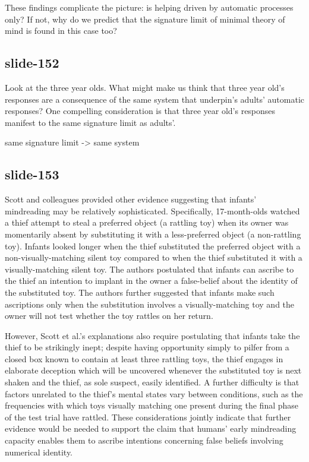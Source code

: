 \documentclass[12pt,\papersize]{extarticle}
\begin{document}
These findings complicate the picture: is helping driven by automatic processes only?
If not, why do we predict that the signature limit of minimal theory of mind
is found in this case too?

\subsection{slide-152}
Look at the three year olds.
What might make us think that three year old’s responses are a consequence
of the same system that underpin’s adults’ automatic responses?
One compelling consideration is that three year old’s responses
manifest to the same signature limit as adults’.

same signature limit -> same system

\subsection{slide-153}
Scott and colleagues \citep{scott:2015_infants} provided other evidence
suggesting that infants’ mindreading may be relatively sophisticated.
Specifically, 17-month-olds watched a thief attempt to steal a preferred
object (a rattling toy) when its owner was momentarily absent by substituting
it with a less-preferred object (a non-rattling toy). Infants looked longer
when the thief substituted the preferred object with a non-visually-matching
silent toy compared to when the thief substituted it with a visually-matching
silent toy. The authors postulated that infants can ascribe to the thief an
intention to implant in the owner a false-belief about the identity of the
substituted toy. The authors further suggested that infants make such ascriptions
only when the substitution involves a visually-matching toy and the owner will
not test whether the toy rattles on her return.

However, Scott et al.’s \citep{scott:2015_infants} explanations also
require postulating that infants take the thief to be strikingly inept;
despite having opportunity simply to pilfer from a closed box known to
contain at least three rattling toys, the thief engages in elaborate
deception which will be uncovered whenever the substituted toy is next
shaken and the thief, as sole suspect, easily identified. A further
difficulty is that factors unrelated to the thief’s mental states vary
between conditions, such as the frequencies with which toys visually matching
one present during the final phase of the test trial have rattled. These
considerations jointly indicate that further evidence would be needed to
support the claim that humans’ early mindreading capacity enables them to
ascribe intentions concerning false beliefs involving numerical identity.
\end{document}
